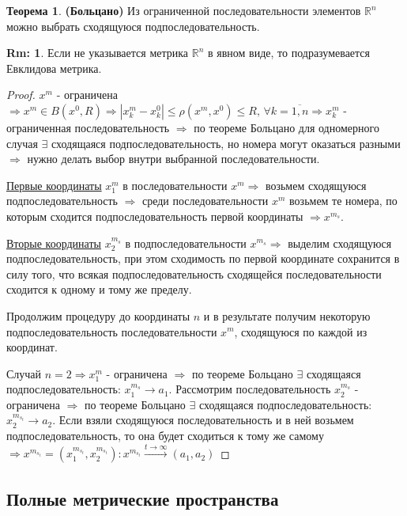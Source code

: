 \documentclass[12pt]{article}
\newcommand{\MR}{\mathbb{R}}
\theoremstyle{definition}
\newtheorem{rem}{Rm:}
\newtheorem{theorem}{Теорема}
\begin{document}
\begin{theorem}\textbf{(Больцано)}
	Из ограниченной последовательности элементов $\MR^n$ можно выбрать сходящуюся подпоследовательность.
\end{theorem}
\begin{rem}
	Если не указывается метрика $\MR^n$ в явном виде, то подразумевается Евклидова метрика.
\end{rem}
\begin{proof}
	$x^m$ - ограничена $\Rightarrow x^m \in B(x^0, R) \Rightarrow |x_k^m - x_k^0| \leq \rho(x^m,x^0) \leq R, \, \forall k = \overline{1,n} \Rightarrow x_k^m$ - ограниченная последовательность $\Rightarrow$ по теореме Больцано для одномерного случая $\exists$ сходящаяся подпоследовательность, но номера могут оказаться разными $\Rightarrow$ нужно делать выбор внутри выбранной последовательности. 
	
	\uline{Первые координаты} $x_1^m$ в последовательности $x^m \Rightarrow$ возьмем сходящуюся подпоследовательность $\Rightarrow$ среди последовательности $x^m$ возьмем те номера, по которым сходится подпоследовательность первой координаты $\Rightarrow x^{m_s}$.
	
	\uline{Вторые координаты} $x_2^{m_s}$ в подпоследовательности $x^{m_s} \Rightarrow$ выделим сходящуюся подпоследовательность, при этом сходимость по первой координате сохранится в силу того, что всякая подпоследовательность сходящейся последовательности сходится к одному и тому же пределу. 
	
	Продолжим процедуру до координаты $n$ и в результате получим некоторую подпоследовательность последовательности $x^m$, сходящуюся по каждой из координат.
	
	Случай $n=2 \Rightarrow x_1^m$ - ограничена $\Rightarrow$ по теореме Больцано $\exists$ сходящаяся подпоследовательность: $x_1^{m_s} \to a_1$. Рассмотрим последовательность $x_2^{m_s}$ - ограничена $\Rightarrow$ по теореме Больцано $\exists$ сходящаяся подпоследовательность: $x_2^{m_{s_t}} \to a_2$. Если взяли сходящуюся последовательность и в ней возьмем подпоследовательность, то она будет сходиться к тому же самому $\Rightarrow x^{m_{s_t}} = (x_1^{m_{s_t}},x_2^{m_{s_t}}) \colon  x^{m_{s_t}} \xrightarrow[]{t \to \infty} (a_1,a_2)$
\end{proof}

\newpage
\subsection*{Полные метрические пространства}
\end{document}

